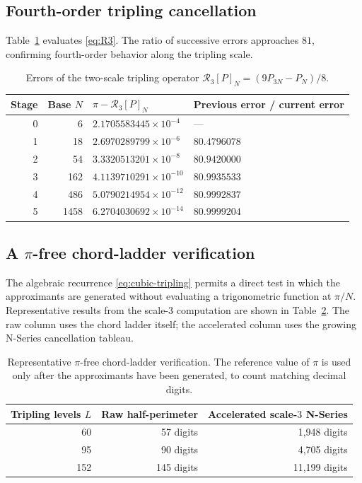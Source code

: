 \documentclass[12pt]{article}
\theoremstyle{definition}
\theoremstyle{remark}
\newcommand{\Rop}{\mathcal{R}}
\begin{document}
\subsection{Fourth-order tripling cancellation}

Table~\ref{tab:R3} evaluates \eqref{eq:R3}.  The ratio of successive errors
approaches $81$, confirming fourth-order behavior along the tripling scale.

\begin{table}[htbp]
\centering
\caption{Errors of the two-scale tripling operator
$\Rop_3[P]_N=(9P_{3N}-P_N)/8$.}
\label{tab:R3}
\small
\begin{tabular}{@{}r r l l@{}}
\toprule
Stage & Base $N$ & $\pi-\Rop_3[P]_N$ & Previous error / current error \\
\midrule
0 & 6    & $2.1705583445\times10^{-4}$ & --- \\
1 & 18   & $2.6970289799\times10^{-6}$ & $80.4796078$ \\
2 & 54   & $3.3320513201\times10^{-8}$ & $80.9420000$ \\
3 & 162  & $4.1139710291\times10^{-10}$ & $80.9935533$ \\
4 & 486  & $5.0790214954\times10^{-12}$ & $80.9992837$ \\
5 & 1458 & $6.2704030692\times10^{-14}$ & $80.9999204$ \\
\bottomrule
\end{tabular}
\end{table}

\subsection{A $\pi$-free chord-ladder verification}

The algebraic recurrence \eqref{eq:cubic-tripling} permits a direct test in
which the approximants are generated without evaluating a trigonometric
function at $\pi/N$.  Representative results from the scale-$3$ computation
are shown in Table~\ref{tab:pi-free}.  The raw column uses the chord ladder
itself; the accelerated column uses the growing N-Series cancellation tableau.

\begin{table}[htbp]
\centering
\caption{Representative $\pi$-free chord-ladder verification.  The reference
value of $\pi$ is used only after the approximants have been generated, to
count matching decimal digits.}
\label{tab:pi-free}
\begin{tabular}{@{}r r r@{}}
\toprule
Tripling levels $L$ & Raw half-perimeter & Accelerated scale-$3$ N-Series \\
\midrule
60  & 57 digits  & 1{,}948 digits \\
95  & 90 digits  & 4{,}705 digits \\
152 & 145 digits & 11{,}199 digits \\
\bottomrule
\end{tabular}
\end{table}
\end{document}
